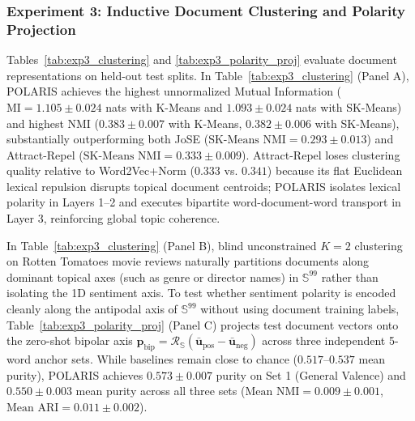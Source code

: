 \documentclass[journal]{IEEEtran}
\begin{document}
\subsubsection{Experiment 3: Inductive Document Clustering and Polarity Projection}
Tables~\ref{tab:exp3_clustering} and \ref{tab:exp3_polarity_proj} evaluate document representations on held-out test splits. In Table~\ref{tab:exp3_clustering} (Panel A), POLARIS achieves the highest unnormalized Mutual Information ($\text{MI} = 1.105 \pm 0.024$ nats with K-Means and $1.093 \pm 0.024$ nats with SK-Means) and highest NMI ($0.383 \pm 0.007$ with K-Means, $0.382 \pm 0.006$ with SK-Means), substantially outperforming both JoSE ($\text{SK-Means NMI} = 0.293 \pm 0.013$) and Attract-Repel ($\text{SK-Means NMI} = 0.333 \pm 0.009$). Attract-Repel loses clustering quality relative to Word2Vec+Norm ($0.333$ vs. $0.341$) because its flat Euclidean lexical repulsion disrupts topical document centroids; POLARIS isolates lexical polarity in Layers 1--2 and executes bipartite word-document-word transport in Layer 3, reinforcing global topic coherence.

In Table~\ref{tab:exp3_clustering} (Panel B), blind unconstrained $K=2$ clustering on Rotten Tomatoes movie reviews naturally partitions documents along dominant topical axes (such as genre or director names) in $\mathbb{S}^{99}$ rather than isolating the 1D sentiment axis. To test whether sentiment polarity is encoded cleanly along the antipodal axis of $\mathbb{S}^{99}$ without using document training labels, Table~\ref{tab:exp3_polarity_proj} (Panel C) projects test document vectors onto the zero-shot bipolar axis $\mathbf{p}_{\text{bip}} = \mathcal{R}_{\mathbb{S}}(\bar{\mathbf{u}}_{\text{pos}} - \bar{\mathbf{u}}_{\text{neg}})$ across three independent 5-word anchor sets. While baselines remain close to chance ($0.517$--$0.537$ mean purity), POLARIS achieves $0.573 \pm 0.007$ purity on Set 1 (General Valence) and $0.550 \pm 0.003$ mean purity across all three sets ($\text{Mean NMI} = 0.009 \pm 0.001$, $\text{Mean ARI} = 0.011 \pm 0.002$).
\end{document}
